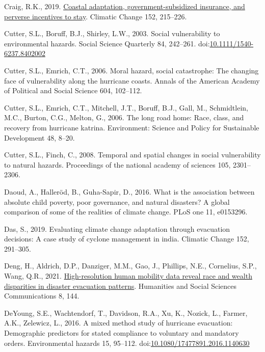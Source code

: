 \documentclass[]{elsarticle} %
\newlength{\cslhangindent}
\newlength{\cslentryspacingunit} %
\newenvironment{CSLReferences}[2] %
 {%
  \setlength{\parindent}{0pt}
  \ifodd #1
  \let\oldpar\par
  \def\par{\hangindent=\cslhangindent\oldpar}
  \fi
  \setlength{\parskip}{#2\cslentryspacingunit}
 }%
 {}
\begin{document}
\begin{CSLReferences}{1}{0}
\leavevmode{}%
Craig, R.K., 2019.
\href{https://doi.org/10.1007/s10584-018-2203-5}{Coastal adaptation,
government-subsidized insurance, and perverse incentives to stay}.
Climatic Change 152, 215--226.

\leavevmode{}%
Cutter, S.L., Boruff, B.J., Shirley, L.W., 2003. Social vulnerability to
environmental hazards. Social Science Quarterly 84, 242--261.
doi:\href{https://doi.org/10.1111/1540-6237.8402002}{10.1111/1540-6237.8402002}

\leavevmode{}%
Cutter, S.L., Emrich, C.T., 2006. Moral hazard, social catastrophe: The
changing face of vulnerability along the hurricane coasts. Annals of the
American Academy of Political and Social Science 604, 102--112.

\leavevmode{}%
Cutter, S.L., Emrich, C.T., Mitchell, J.T., Boruff, B.J., Gall, M.,
Schmidtlein, M.C., Burton, C.G., Melton, G., 2006. The long road home:
Race, class, and recovery from hurricane katrina. Environment: Science
and Policy for Sustainable Development 48, 8--20.

\leavevmode{}%
Cutter, S.L., Finch, C., 2008. Temporal and spatial changes in social
vulnerability to natural hazards. Proceedings of the national academy of
sciences 105, 2301--2306.

\leavevmode{}%
Daoud, A., Halleröd, B., Guha-Sapir, D., 2016. What is the association
between absolute child poverty, poor governance, and natural disasters?
A global comparison of some of the realities of climate change. PLoS one
11, e0153296.

\leavevmode{}%
Das, S., 2019. Evaluating climate change adaptation through evacuation
decisions: A case study of cyclone management in india. Climatic Change
152, 291--305.

\leavevmode{}%
Deng, H., Aldrich, D.P., Danziger, M.M., Gao, J., Phillips, N.E.,
Cornelius, S.P., Wang, Q.R., 2021.
\href{https://doi.org/10.1057/s41599-021-00824-8}{High-resolution human
mobility data reveal race and wealth disparities in disaster evacuation
patterns}. Humanities and Social Sciences Communications 8, 144.

\leavevmode{}%
DeYoung, S.E., Wachtendorf, T., Davidson, R.A., Xu, K., Nozick, L.,
Farmer, A.K., Zelewicz, L., 2016. A mixed method study of hurricane
evacuation: Demographic predictors for stated compliance to voluntary
and mandatory orders. Environmental hazards 15, 95--112.
doi:\href{https://doi.org/10.1080/17477891.2016.1140630}{10.1080/17477891.2016.1140630}


\end{CSLReferences}
\end{document}
